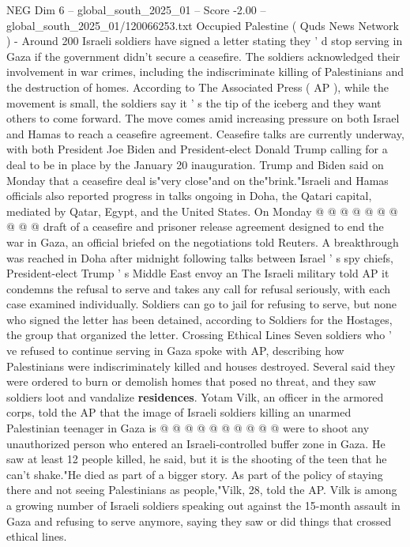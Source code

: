 \begin{textsample}{NEG Dim 6 – global\_south\_2025\_01 – Score -2.00 – global\_south\_2025\_01/120066253.txt}  \label{ex:f6_neg_002}
Occupied Palestine ( Quds News Network ) - Around 200 Israeli soldiers have signed a letter stating they ' d stop serving in Gaza if the government didn't secure a ceasefire.
The soldiers acknowledged their involvement in war crimes, including the indiscriminate killing of Palestinians and the destruction of homes.
According to The Associated Press ( AP ), while the movement is small, the soldiers say it ' s the tip of the iceberg and they want others to come forward.
The move comes amid increasing pressure on both Israel and Hamas to reach a ceasefire agreement.
Ceasefire talks are currently underway, with both President Joe Biden and President-elect Donald Trump calling for a deal to be in place by the January 20 inauguration.
Trump and Biden said on Monday that a ceasefire deal is"very close"and on the"brink."Israeli and Hamas officials also reported progress in talks ongoing in Doha, the Qatari capital, mediated by Qatar, Egypt, and the United States.
On Monday @ @ @ @ @ @ @ @ @ @ draft of a ceasefire and prisoner release agreement designed to end the war in Gaza, an official briefed on the negotiations told Reuters.
A breakthrough was reached in Doha after midnight following talks between Israel ' s spy chiefs, President-elect Trump ' s Middle East envoy an The Israeli military told AP it condemns the refusal to serve and takes any call for refusal seriously, with each case examined individually.
Soldiers can go to jail for refusing to serve, but none who signed the letter has been detained, according to Soldiers for the Hostages, the group that organized the letter.
Crossing Ethical Lines Seven soldiers who ' ve refused to continue serving in Gaza spoke with AP, describing how Palestinians were indiscriminately killed and houses destroyed.
Several said they were ordered to burn or demolish homes that posed no threat, and they saw soldiers loot and vandalize \textbf{residences}.
Yotam Vilk, an officer in the armored corps, told the AP that the image of Israeli soldiers killing an unarmed Palestinian teenager in Gaza is @ @ @ @ @ @ @ @ @ @ were to shoot any unauthorized person who entered an Israeli-controlled buffer zone in Gaza.
He saw at least 12 people killed, he said, but it is the shooting of the teen that he can't shake."He died as part of a bigger story.
As part of the policy of staying there and not seeing Palestinians as people,"Vilk, 28, told the AP.
Vilk is among a growing number of Israeli soldiers speaking out against the 15-month assault in Gaza and refusing to serve anymore, saying they saw or did things that crossed ethical lines.

\end{textsample}

